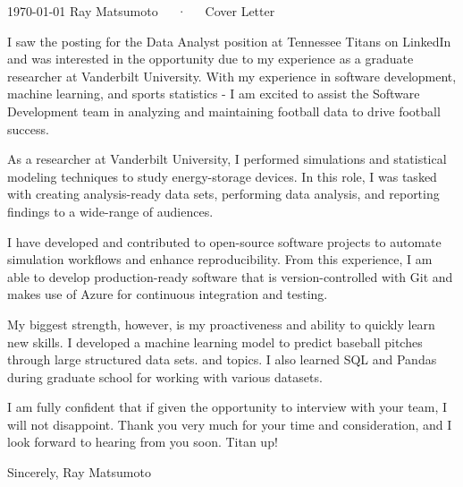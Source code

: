 \documentclass[11pt, a4paper]{awesome-cv}
\begin{document}
\makecvheader[R]

\makecvfooter
  {\today}
  {Ray Matsumoto~~~·~~~Cover Letter}
  {}

\makelettertitle

\begin{cvletter}

I saw the posting for the Data Analyst position at Tennessee Titans on LinkedIn
and was interested in the opportunity due to my experience as a graduate
    researcher at Vanderbilt University.  With my experience in software
    development, machine learning, and sports statistics - I am excited to
    assist the Software Development team in analyzing and maintaining football
    data to drive football success.

As a researcher at Vanderbilt University, I performed simulations and
    statistical modeling techniques to study energy-storage devices.  In this
    role, I was tasked with creating analysis-ready data sets, performing data
    analysis, and reporting findings to a wide-range of audiences. 

    I have developed and contributed to open-source software projects to
    automate simulation workflows and enhance reproducibility.  From this
    experience, I am able to develop production-ready software that is
    version-controlled with Git and makes use of Azure for continuous
    integration and testing.

    My biggest strength, however, is my proactiveness and ability to quickly
    learn new skills.
    I developed a machine learning model to predict baseball pitches through
    large structured data sets.
    and topics. 
    I also learned SQL and Pandas during graduate school for working with
    various datasets.

    I am fully confident that if given the opportunity to interview with your
    team, I will not disappoint.  Thank you very much for your time and
    consideration, and I look forward to hearing from you soon.  Titan up!

    Sincerely,
    Ray Matsumoto
\end{cvletter}


\makeletterclosing
\end{document}

